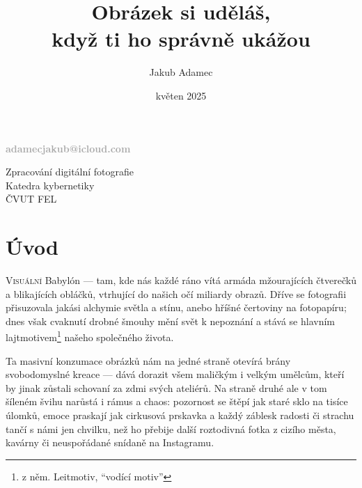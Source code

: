 \documentclass[12pt]{article} %
\title{%
  Obrázek si uděláš, \\
  \large když ti ho správně ukážou}
\author{Jakub Adamec}
\date{květen 2025}
\begin{document}
\makeatletter
\begin{titlepage}
    \centering
    \vspace*{1cm}

    {\Huge\bfseries \textcolor{DarkGray}{\@title} \par}
    \vspace{2.5cm}

    {\Large\bfseries \textcolor{DarkGray}{\@author} \par}
    \vspace{0.2cm}

    {\bfseries \textcolor{DarkGray}{adamecjakub@icloud.com} \par}
    \vspace{1.5cm}

    {\large\bfseries \textcolor{DarkGray}{\@date} \par}
    \vfill


    \vspace*{1cm}
    {\large Zpracování digitální fotografie \\ Katedra kybernetiky \\ ČVUT FEL\par} %
\end{titlepage}
\makeatother

\pagestyle{fancy}

\section{Úvod}
\lettrine[lines=3, findent=5pt, nindent=0pt]{V}{isuální} Babylón — tam, kde nás každé ráno vítá 
armáda mžourajících čtverečků a blikajících obláčků, vtrhující do našich očí miliardy obrazů. Dříve se fotografii 
přisuzovala jakási alchymie světla a stínu, anebo hříšné čertoviny na fotopapíru; dnes však cvaknutí drobné šmouhy mění 
svět k nepoznání a stává se hlavním lajtmotivem\footnote{z něm. Leitmotiv, \enquote{vodící motiv}} našeho společného 
života.

Ta masivní konzumace obrázků nám na jedné straně otevírá brány svobodomyslné kreace — dává dorazit všem maličkým i 
velkým umělcům, kteří by jinak zůstali schovaní za zdmi svých ateliérů. Na straně druhé ale v tom šíleném švihu narůstá 
i rámus a chaos: pozornost se štěpí jak staré sklo na tisíce úlomků, emoce praskají jak cirkusová prskavka a každý 
záblesk radosti či strachu tančí s námi jen chvilku, než ho přebije další roztodivná fotka z cizího města, kavárny či 
neuspořádané snídaně na Instagramu.
\end{document}
